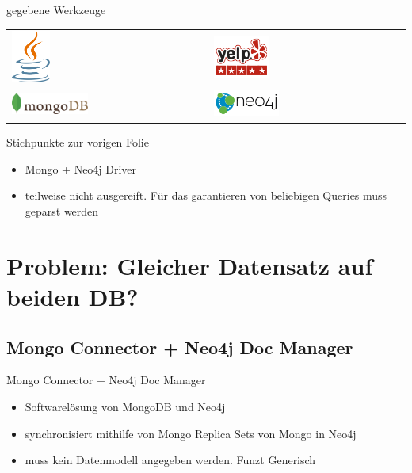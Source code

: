 \documentclass[12pt,usenames,dvipsnames]{beamer}
\begin{document}
		\begin{frame}{gegebene Werkzeuge}
		\begin{table}[]
\begin{tabular}{ll}
\includegraphics[width=0.2\textwidth]{java}  & \includegraphics[width=0.3\textwidth]{yelp} \\
\includegraphics[width=0.4\textwidth]{mongodb}  & \includegraphics[width=0.35\textwidth]{neo4j}
\end{tabular}
\end{table}
	\end{frame}
\begin{frame}{Stichpunkte zur vorigen Folie}
\begin{itemize}[<+- | alert@+>]
\item Mongo + Neo4j Driver
\item teilweise nicht ausgereift. Für das garantieren von beliebigen Queries muss geparst werden

\end{itemize}

\end{frame}
\section{Problem: Gleicher Datensatz auf beiden DB?}
\subsection{Mongo Connector + Neo4j Doc Manager}
\begin{frame}{Mongo Connector + Neo4j Doc Manager}
\begin{itemize}
\item Softwarelösung von MongoDB und Neo4j
\item synchronisiert mithilfe von Mongo Replica Sets von Mongo in Neo4j
\item muss kein Datenmodell angegeben werden. Funzt Generisch
\end{itemize}
\end{frame}
\end{document}
